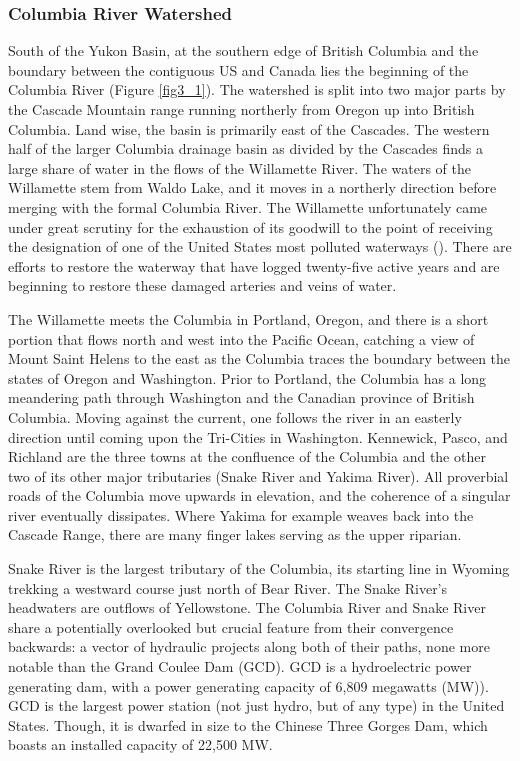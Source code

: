 \begin{refsection}
\subsubsection{Columbia River Watershed}
South of the Yukon Basin, at the southern edge of British Columbia and the boundary between the contiguous US and Canada lies the beginning of the Columbia River (Figure \ref{fig3_1}). The watershed is split into two major parts by the Cascade Mountain range running northerly from Oregon up into British Columbia. Land wise, the basin is primarily east of the Cascades. The western half of the larger Columbia drainage basin as divided by the Cascades finds a large share of water in the flows of the Willamette River. The waters of the Willamette stem from Waldo Lake, and it moves in a northerly direction before merging with the formal Columbia River. The Willamette unfortunately came under great scrutiny for the exhaustion of its goodwill to the point of receiving the designation of one of the United States most polluted waterways (\cite{lundin2019legacy}). There are efforts to restore the waterway that have logged twenty-five active years and are beginning to restore these damaged arteries and veins of water. 

The Willamette meets the Columbia in Portland, Oregon, and there is a short portion that flows north and west into the Pacific Ocean, catching a view of Mount Saint Helens to the east as the Columbia traces the boundary between the states of Oregon and Washington. Prior to Portland, the Columbia has a long meandering path through Washington and the Canadian province of British Columbia. Moving against the current, one follows the river in an easterly direction until coming upon the Tri-Cities in Washington. Kennewick, Pasco, and Richland are the three towns at the confluence of the Columbia and the other two of its other major tributaries (Snake River and Yakima River). All proverbial roads of the Columbia move upwards in elevation, and the coherence of a singular river eventually dissipates. Where Yakima for example weaves back into the Cascade Range, there are many finger lakes serving as the upper riparian. 

Snake River is the largest tributary of the Columbia, its starting line in Wyoming trekking a westward course just north of Bear River. The Snake River’s headwaters are outflows of Yellowstone. The Columbia River and Snake River share a potentially overlooked but crucial feature from their convergence backwards: a vector of hydraulic projects along both of their paths, none more notable than the Grand Coulee Dam (GCD). GCD is a hydroelectric power generating dam, with a power generating capacity of 6,809 megawatts (MW)). GCD is the largest power station (not just hydro, but of any type) in the United States. Though, it is dwarfed in size to the Chinese Three Gorges Dam, which boasts an installed capacity of 22,500 MW.


\end{refsection}
